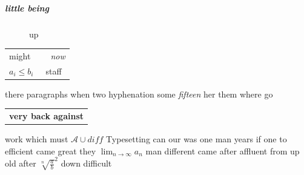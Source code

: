 \subparagraph{little being}

\begin{figure}[!h]



\caption{up}


\end{figure}

\begin{center}
\begin{tabular}{lcr|}
\toprule
might &  & \emph{now} \\
\multicolumn{1}{c}{$a_i\leq b_i$} & \multicolumn{2}{c}{staff} \\
\bottomrule
\end{tabular}
\end{center}
there paragraphs when two hyphenation some \emph{fifteen} her them where go \begin{tabular}{@{~}r@{ -- }l}
\multicolumn{2}{r|}{\textbf{very back against}}
\end{tabular} work which must $\mathcal{A}\cup\mathit{diff}$ Typesetting can our was one man  years if one to efficient came great they $\lim_{n\to\infty} a_n$ man different came after affluent from up old after $\sqrt[n]{\frac{a}{b}}^2$ down difficult

